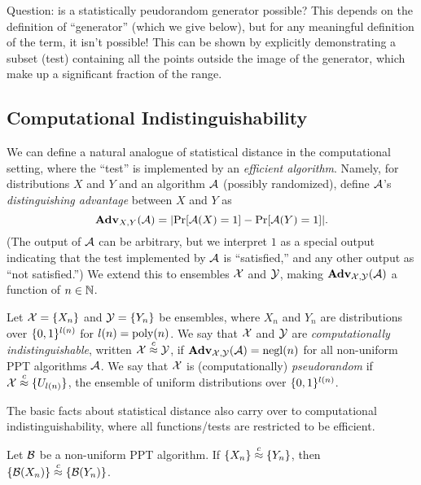 \documentclass[11pt]{article}
\begin{document}
Question: is a statistically peudorandom generator possible?  This
depends on the definition of ``generator'' (which we give below), but
for any meaningful definition of the term, it isn't possible!  This
can be shown by explicitly demonstrating a subset (test) containing
all the points outside the image of the generator, which make up a
significant fraction of the range.

\subsection{Computational Indistinguishability}
\label{sec:comp-indist}

We can define a natural analogue of statistical distance in the
computational setting, where the ``test'' is implemented by an
\emph{efficient algorithm}.  Namely, for distributions $X$ and $Y$ and
an algorithm $\mathcal{A}$ (possibly randomized), define $\mathcal{A}$'s
\emph{distinguishing advantage} between $X$ and $Y$ as \[
\advan_{X,Y}(\Adv) = \abs*{\Pr[\Adv(X)=1] - \Pr[\Adv(Y)=1]}. \] (The
output of $\mathcal{A}$ can be arbitrary, but we interpret $1$ as a special
output indicating that the test implemented by $\mathcal{A}$ is
``satisfied,'' and any other output as ``not satisfied.'')  We extend
this to ensembles $\mathcal{X}$ and $\mathcal{Y}$, making
$\mathbf{Adv}_{\mathcal{X},\mathcal{Y}}(\mathcal{A})$ a function of $n \in \mathbb{N}$.

\begin{definition}
  \label{def:comp-ind}
  Let $\mathcal{X} = \{X_{n}\}$ and $\mathcal{Y} = \{Y_{n}\}$ be ensembles,
  where $X_{n}$ and $Y_{n}$ are distributions over $\{0,1\}^{l(n)}$ for
  $l(n) = \operatorname{poly}(n)$.  We say that $\mathcal{X}$ and $\mathcal{Y}$ are
  \emph{computationally indistinguishable}, written $\mathcal{X} \stackrel{c}{\approx}
  \mathcal{Y}$, if $\mathbf{Adv}_{\mathcal{X},\mathcal{Y}}(\mathcal{A}) = \operatorname{negl}(n)$ for all
  non-uniform PPT algorithms $\mathcal{A}$.  We say that $\mathcal{X}$ is
  (computationally) \emph{pseudorandom} if $\mathcal{X} \stackrel{c}{\approx}
  \{U_{l(n)}\}$, the ensemble of uniform distributions over
  $\{0,1\}^{l(n)}$.
\end{definition}

The basic facts about statistical distance also carry over to
computational indistinguishability, where all functions/tests are
restricted to be efficient.

\begin{lemma}
  \label{lem:closure}
  Let $\mathcal{B}$ be a non-uniform PPT algorithm.  If $\{X_{n}\}
  \stackrel{c}{\approx} \{Y_{n}\}$, then $\{\mathcal{B}(X_{n})\} \stackrel{c}{\approx}
  \{\mathcal{B}(Y_{n})\}$.
\end{lemma}
\end{document}
